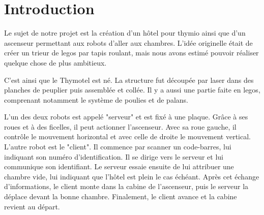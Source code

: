 \chapter{Introduction}

Le sujet de notre projet est la création d'un hôtel pour thymio ainsi que d'un ascenseur permettant aux robots d'aller aux chambres.
L'idée originelle était de créer un trieur de legos par tapis roulant, mais nous avons estimé pouvoir réaliser quelque chose de plus ambitieux.

C'est ainsi que le Thymotel est né. La structure fut découpée par laser dans des planches de peuplier puis assemblée et collée.
Il y a aussi une partie faite en legos, comprenant notamment le système de poulies et de palans.

L'un des deux robots est appelé "serveur" et est fixé à une plaque.
Grâce à ses roues et à des ficelles, il peut actionner l'ascenseur.
Avec sa roue gauche, il contrôle le mouvement horizontal et avec celle de droite le mouvement vertical.
L'autre robot est le "client".
Il commence par scanner un code-barres, lui indiquant son numéro d'identification.
Il se dirige vers le serveur et lui communique son identifiant.
Le serveur essaie ensuite de lui attribuer une chambre vide, lui indiquant que l'hôtel est plein le cas échéant.
Après cet échange d'informations, le client monte dans la cabine de l'ascenseur, puis le serveur la déplace devant la bonne chambre.
Finalement, le client avance et la cabine revient au départ.
